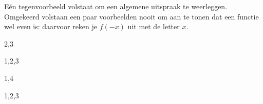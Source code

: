Eén tegenvoorbeeld volstaat om een algemene uitspraak te weerleggen. Omgekeerd volstaan een paar voorbeelden nooit om aan te tonen dat een functie wel even is: daarvoor reken je $f(-x)$ uit met de letter $x$.

\begin{oefeningen}
\end{oefeningen}

\opdrachtenkop

\begin{oefeningen}




\begin{alleenvoor}{2,3}

\end{alleenvoor}
\begin{alleenvoor}{1,2,3}

\end{alleenvoor}
\begin{alleenvoor}{1,4}
\end{alleenvoor}







\begin{alleenvoor}{1,2,3}

\end{alleenvoor}







\end{oefeningen}
